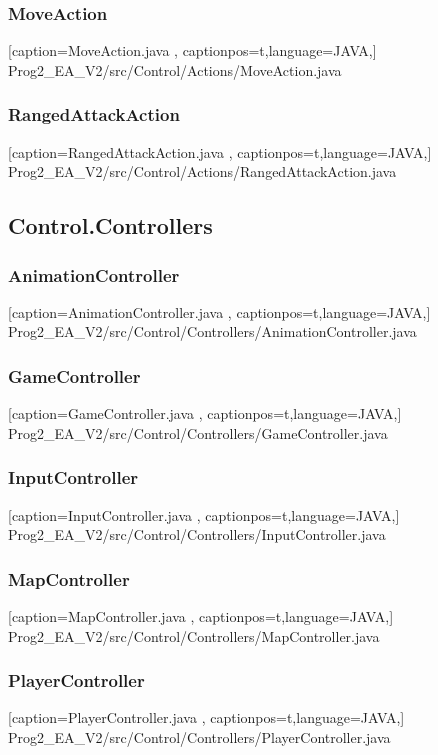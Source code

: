 \documentclass[a4paper,12pt]{scrartcl}
\begin{document}
	\subsubsection{MoveAction}
	
	[caption={MoveAction.java}
	\label{lst:javaclass},
	captionpos=t,language=JAVA,]
	{Prog2_EA_V2/src/Control/Actions/MoveAction.java}
	\subsubsection{RangedAttackAction}
	
	[caption={RangedAttackAction.java}
	\label{lst:javaclass},
	captionpos=t,language=JAVA,]
	{Prog2_EA_V2/src/Control/Actions/RangedAttackAction.java}
	\subsection{Control.Controllers}
	\subsubsection{AnimationController}
	
	[caption={AnimationController.java}
	\label{lst:javaclass},
	captionpos=t,language=JAVA,]
	{Prog2_EA_V2/src/Control/Controllers/AnimationController.java}
	\subsubsection{GameController}
	
	[caption={GameController.java}
	\label{lst:javaclass},
	captionpos=t,language=JAVA,]
	{Prog2_EA_V2/src/Control/Controllers/GameController.java}
	\subsubsection{InputController}
	
	[caption={InputController.java}
	\label{lst:javaclass},
	captionpos=t,language=JAVA,]
	{Prog2_EA_V2/src/Control/Controllers/InputController.java}
	\subsubsection{MapController}
	
	[caption={MapController.java}
	\label{lst:javaclass},
	captionpos=t,language=JAVA,]
	{Prog2_EA_V2/src/Control/Controllers/MapController.java}
	\subsubsection{PlayerController}
	
	[caption={PlayerController.java}
	\label{lst:javaclass},
	captionpos=t,language=JAVA,]
	{Prog2_EA_V2/src/Control/Controllers/PlayerController.java}
\end{document}
